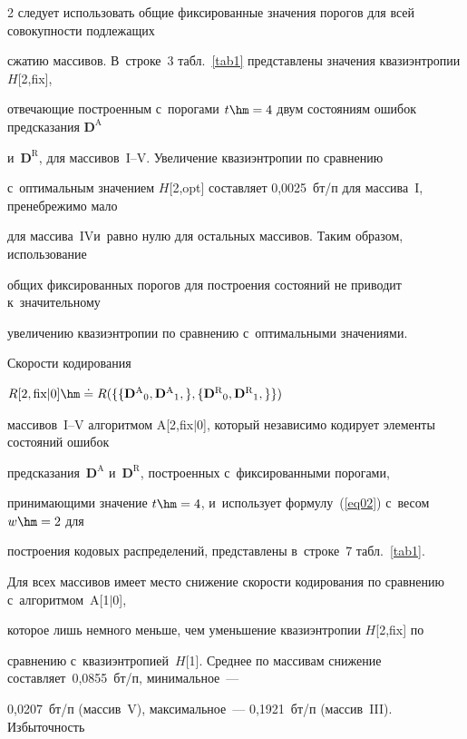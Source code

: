 \begin{multicols}{2}
следует использовать общие фиксированные значения порогов для всей совокупности подлежащих 

сжатию массивов. В~строке~3 табл.~\ref{tab1} представлены значения квазиэнтропии $H$[2,fix], 

отвечающие построенным с~порогами $t\hm=4$ двум состояниям ошибок предсказания $\mathbf{D}^\text{A}$ 

и~$\mathbf{D}^\text{R}$, для массивов~I--V. Увеличение квазиэнтропии по сравнению 

с~оптимальным значением $H$[2,opt] составляет 0,0025~бт/п для массива~I, пренебрежимо мало 

для массива~IV\linebreak и~равно нулю для остальных массивов. Таким об\-разом, использование 

общих фиксированных поро\-гов для построения состояний не приводит к~значительному 

увеличению квазиэнтропии по сравнению с~оптимальными значениями.



Скорости кодирования

$R[2,\text{fix}|0] \hm\doteq  R(\{ 

\{{\mathbf{D}^\text{A} }_0,{\mathbf{D}^\text{A} }_1,\},

\{{\mathbf{D}^\text{R} }_0,{\mathbf{D}^\text{R} }_1,\}

\})$

массивов~I--V алгоритмом A[2,fix$\vert$0], который независимо кодирует элементы состояний ошибок 

предсказания~$\mathbf{D}^\text{A}$ и~$\mathbf{D}^\text{R}$, построенных с~фиксированными порогами, 

принимающими значение $t\hm=4$, и~использует формулу~(\ref{eq02}) с~весом $w\hm=2$ для 

построения кодовых распределений, представлены в~строке~7 табл.~\ref{tab1}.\linebreak  

Для всех массивов имеет место снижение скорости кодирования по сравнению с~алгоритмом~A[1$\vert$0], 

которое лишь немного меньше, чем уменьшение \mbox{квазиэнтропии} $H$[2,fix] по 

сравнению с~квазиэнтропией~$H$[1]. Среднее по массивам снижение составляет~0,0855~бт/п, минимальное~--- 

0,0207~бт/п (массив~V), максимальное~--- 0,1921~бт/п (массив~III). Избыточность 


\end{multicols}
